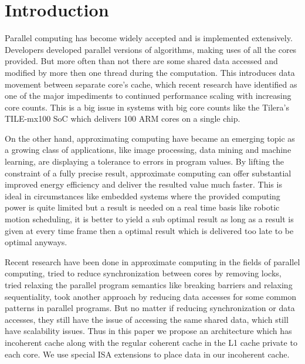 \documentclass[12pt,conference]{IEEEtran}
\begin{document}




%
\IEEEpeerreviewmaketitle



\section{Introduction}

Parallel computing has become widely accepted 
and is implemented extensively. Developers developed parallel versions
of algorithms, making uses of all the cores provided. But more often than not
there are some shared data accessed and modified by more then one
thread during the computation. This introduces data movement between
separate core's cache, which recent research have identified as one of the major
impediments to continued performance scaling with increasing core counts. This
is a big issue in systems with big core counts like the Tilera's TILE-mx100 SoC 
which delivers 100 ARM cores on a single chip\cite{tile}.

On the other hand, approximating computing have became an emerging topic
as a growing class of applications, like image processing, data mining 
and machine learning, are displaying a tolerance to errors in program values.
By lifting the constraint of a fully precise result, approximate computing
can offer substantial improved energy efficiency and deliver the resulted
value much faster. This is ideal in circumstances like embedded systems where
the provided computing power is quite limited but a result is needed on a real
time basis like robotic motion scheduling, it is better to yield a sub optimal 
result as long as a result is given at every time frame then a optimal result
which is delivered too late to be optimal anyways.

Recent research have been done in approximate computing in the fields of
parallel computing, \cite{ibm} tried to reduce synchronization between cores 
by removing locks, \cite{helixup} tried relaxing the parallel program 
semantics like breaking barriers and relaxing sequentiality, \cite{paraprox}
took another approach by reducing data accesses for some common patterns in
parallel programs. But no matter if reducing synchronization or data accesses,
they still have the issue of accessing the same shared data, which still
have scalability issues. Thus in this paper we propose an architecture which
has incoherent cache along with the regular coherent cache in the L1 cache
private to each core. We use special ISA extensions to place data in our incoherent cache.
\end{document}
